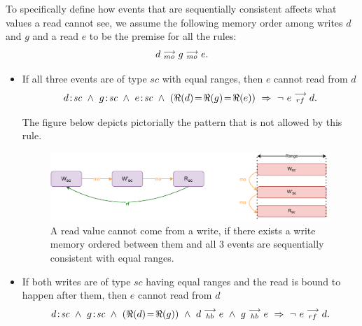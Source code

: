             To specifically define how events that are sequentially consistent affects what values a read cannot see, we assume the following memory order among writes $d$ and $g$ and a read $e$ to be the premise for all the rules:  
                \begin{align*}
                    d \stackrel{\longrightarrow}{_{mo}} g \stackrel{\longrightarrow}{_{mo}} e.
                \end{align*}
               
            \begin{itemize}
                \item If all three events are of type $sc$ with equal ranges, then $e$ cannot read from $d$
                    \begin{align*}
                        \et{d}{sc}\ \wedge\ \et{g}{sc}\ \wedge\ \et{e}{sc} 
                        \ \wedge \ (\Re(d) \!=\! \Re(g) \!=\! \Re(e))
                        \ \Rightarrow{} \ 
                        \neg \ \reln{e}{rf}{d}.
                    \end{align*} 
                        
                    The figure below depicts pictorially the pattern that is not allowed by this rule.
                    \begin{figure}[H]
                        \centering 
                        \includegraphics[scale=0.7]{ECMAScriptMemoryModel/SequentialAtomics1.pdf}
                        \caption{A read value cannot come from a write, if there exists a write memory ordered between them and all  3 events are sequentially consistent with equal ranges.}
                    \end{figure}
                    
                \item If both writes are of type $sc$ having equal ranges and the read is bound to happen after them, then $e$ cannot read from $d$ 
                    \begin{align*}
                        d\!:\!\textit{sc}\ \wedge\ g\!:\!\textit{sc}  
                        \ \wedge \ (\Re(d) \!=\! \Re(g)) 
                        \ \wedge \ d\stackrel{\longrightarrow}{_{hb}}e
                        \ \wedge \ g\stackrel{\longrightarrow}{_{hb}}e
                        \ \Rightarrow{}\  
                        \neg \ e\stackrel{\longrightarrow}{_{rf}}d.
                    \end{align*}
                        

\end{itemize}
